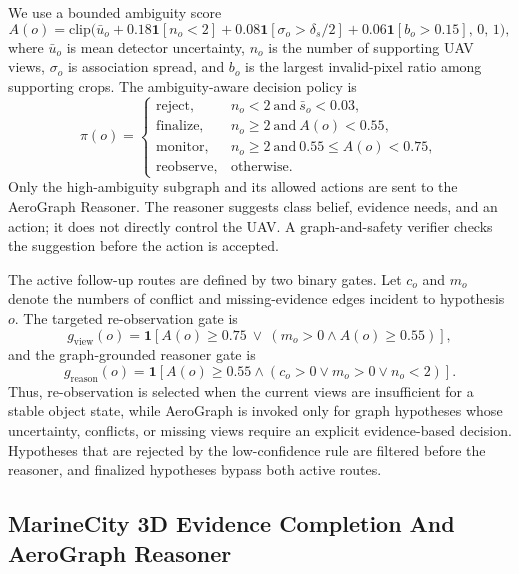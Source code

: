 We use a bounded ambiguity score
\begin{equation}
A(o)=\mathrm{clip}\big(
\bar{u}_o
+0.18\mathbf{1}[n_o<2]
+0.08\mathbf{1}[\sigma_o>\delta_s/2]
+0.06\mathbf{1}[b_o>0.15],\,0,\,1\big),
\end{equation}
where $\bar{u}_o$ is mean detector uncertainty, $n_o$ is the number of
supporting UAV views, $\sigma_o$ is association spread, and $b_o$ is the
largest invalid-pixel ratio among supporting crops. The ambiguity-aware
decision policy is
\begin{equation}
\pi(o)=
\begin{cases}
\mathrm{reject}, & n_o<2 \ \mathrm{and}\ \bar{s}_o<0.03,\\
\mathrm{finalize}, & n_o\ge2 \ \mathrm{and}\ A(o)<0.55,\\
\mathrm{monitor}, & n_o\ge2 \ \mathrm{and}\ 0.55\le A(o)<0.75,\\
\mathrm{reobserve}, & \mathrm{otherwise}.
\end{cases}
\end{equation}
Only the high-ambiguity subgraph and its allowed actions are sent to the
AeroGraph Reasoner. The reasoner suggests class belief, evidence needs, and an
action; it does not directly control the UAV. A graph-and-safety verifier checks
the suggestion before the action is accepted.

The active follow-up routes are defined by two binary gates. Let $c_o$ and
$m_o$ denote the numbers of conflict and missing-evidence edges incident to
hypothesis $o$. The targeted re-observation gate is
\begin{equation}
g_{\mathrm{view}}(o)=
\mathbf{1}\!\left[A(o)\ge0.75 \ \lor\ (m_o>0 \land A(o)\ge0.55)\right],
\end{equation}
and the graph-grounded reasoner gate is
\begin{equation}
g_{\mathrm{reason}}(o)=
\mathbf{1}\!\left[A(o)\ge0.55 \land (c_o>0 \lor m_o>0 \lor n_o<2)\right].
\end{equation}
Thus, re-observation is selected when the current views are insufficient for a
stable object state, while AeroGraph is invoked only for graph hypotheses whose
uncertainty, conflicts, or missing views require an explicit evidence-based
decision. Hypotheses that are rejected by the low-confidence rule are filtered
before the reasoner, and finalized hypotheses bypass both active routes.

\subsection{MarineCity 3D Evidence Completion And AeroGraph Reasoner}
\label{sec:method_3d_reasoner}

